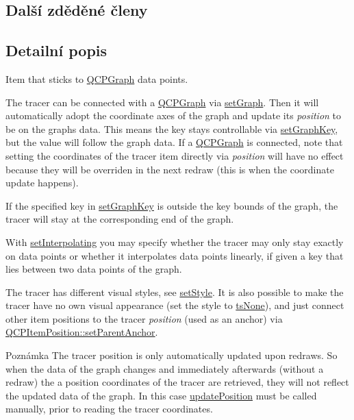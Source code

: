 \subsection*{Další zděděné členy}


\subsection{Detailní popis}
Item that sticks to \hyperlink{classQCPGraph}{Q\+C\+P\+Graph} data points. 

 The tracer can be connected with a \hyperlink{classQCPGraph}{Q\+C\+P\+Graph} via \hyperlink{classQCPItemTracer_af5886f4ded8dd68cb4f3388f390790c0}{set\+Graph}. Then it will automatically adopt the coordinate axes of the graph and update its {\itshape position} to be on the graph\textquotesingle{}s data. This means the key stays controllable via \hyperlink{classQCPItemTracer_a6840143b42f3b685cedf7c6d83a704c8}{set\+Graph\+Key}, but the value will follow the graph data. If a \hyperlink{classQCPGraph}{Q\+C\+P\+Graph} is connected, note that setting the coordinates of the tracer item directly via {\itshape position} will have no effect because they will be overriden in the next redraw (this is when the coordinate update happens).

If the specified key in \hyperlink{classQCPItemTracer_a6840143b42f3b685cedf7c6d83a704c8}{set\+Graph\+Key} is outside the key bounds of the graph, the tracer will stay at the corresponding end of the graph.

With \hyperlink{classQCPItemTracer_a6c244a9d1175bef12b50afafd4f5fcd2}{set\+Interpolating} you may specify whether the tracer may only stay exactly on data points or whether it interpolates data points linearly, if given a key that lies between two data points of the graph.

The tracer has different visual styles, see \hyperlink{classQCPItemTracer_a41a2ac4f1acd7897b4e2a2579c03204e}{set\+Style}. It is also possible to make the tracer have no own visual appearance (set the style to \hyperlink{classQCPItemTracer_a2f05ddb13978036f902ca3ab47076500aac27462c79146225bfa8fba24d2ee8a4}{ts\+None}), and just connect other item positions to the tracer {\itshape position} (used as an anchor) via \hyperlink{classQCPItemPosition_ac094d67a95d2dceafa0d50b9db3a7e51}{Q\+C\+P\+Item\+Position\+::set\+Parent\+Anchor}.

\begin{DoxyNote}{Poznámka}
The tracer position is only automatically updated upon redraws. So when the data of the graph changes and immediately afterwards (without a redraw) the a position coordinates of the tracer are retrieved, they will not reflect the updated data of the graph. In this case \hyperlink{classQCPItemTracer_a5b90296109e36384aedbc8908a670413}{update\+Position} must be called manually, prior to reading the tracer coordinates. 
\end{DoxyNote}



